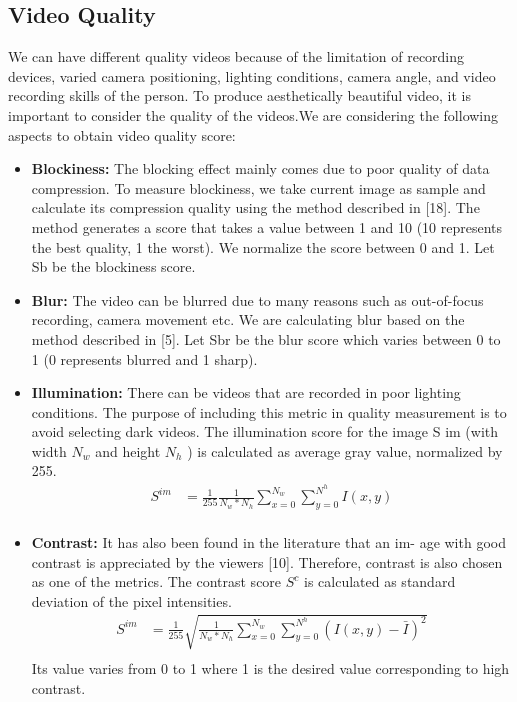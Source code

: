 \documentclass{sig-alternate}
\begin{document}
{{{\subsection{Video Quality}
We can have different quality videos because of the limitation of
recording devices, varied camera positioning, lighting conditions,
camera angle, and video recording skills of the person. To produce
aesthetically beautiful video, it is important to consider the quality
of the videos.We are considering the following aspects to obtain
video quality score:
\begin{itemize}
    \item \textbf{Blockiness: }The blocking effect mainly comes due to poor
quality of data compression. To measure blockiness, we take
current image as sample and calculate its compression quality
using the method described in [18]. The method generates
a score that takes a value between 1 and 10 (10 represents the
best quality, 1 the worst). We normalize the score between 0
and 1. Let Sb be the blockiness score.
   \item \textbf{Blur: }The video can be blurred due to many reasons such as
out-of-focus recording, camera movement etc. We are calculating
blur based on the method described in [5]. Let Sbr
be the blur score which varies between 0 to 1 (0 represents
blurred and 1 sharp).
   \item \textbf{Illumination:} There can be videos that are recorded in poor
lighting conditions. The purpose of including this metric in
quality measurement is to avoid selecting dark videos. The
illumination score for the image S im (with width $N_w$ and
height $N_h$ ) is calculated as average gray value, normalized
by 255.
\begin{align*}
S^{im}&= \frac{1}{255}\frac{1}{N_w*N_h}\sum_{x=0}^{N_w}\sum_{y=0}^{N^h}I(x,y)\\
\end{align*}
\item \textbf{Contrast:} It has also been found in the literature that an im-
age with good contrast is appreciated by the viewers [10].
Therefore, contrast is also chosen as one of the metrics. The
contrast score $S^c$ is calculated as standard deviation of the
pixel intensities.
\begin{align*}
S^{im}&= \frac{1}{255}\sqrt{\frac{1}{N_w*N_h}\sum_{x=0}^{N_w}\sum_{y=0}^{N^h}(I(x,y)-\bar{I})^2}\\
\end{align*}
Its value varies from 0 to 1 where 1 is the desired value corresponding to high contrast.

\end{itemize}}}}
\end{document}

